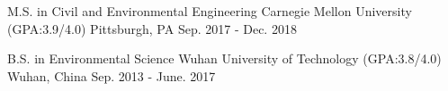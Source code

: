 

\begin{cventries}

  \cventry
    {M.S. in Civil and Environmental Engineering} %
    {Carnegie Mellon University (GPA:3.9/4.0)} %
    {Pittsburgh, PA} %
    {Sep. 2017 - Dec. 2018} %
    {}
    \vspace{-1mm}
    
  \cventry
    {B.S. in Environmental Science} %
    {Wuhan University of Technology (GPA:3.8/4.0)} %
    {Wuhan, China} %
    {Sep. 2013 - June. 2017} %
    {}
    \vspace{-1mm}
   
\end{cventries}

\vspace{-2mm}